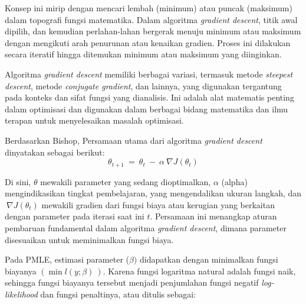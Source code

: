 Konsep ini mirip dengan mencari lembah (minimum) atau puncak (maksimum)
dalam topografi fungsi matematika. Dalam algoritma \emph{gradient
descent}, titik awal dipilih, dan kemudian perlahan-lahan bergerak
menuju minimum atau maksimum dengan mengikuti arah penurunan atau
kenaikan gradien. Proses ini dilakukan secara iteratif hingga ditemukan
minimum atau maksimum yang diinginkan.

Algoritma \emph{gradient descent} memiliki berbagai variasi, termasuk
metode \emph{steepest descent}, metode \emph{conjugate gradient}, dan
lainnya, yang digunakan tergantung pada konteks dan sifat fungsi yang
dianalisis. Ini adalah alat matematis penting dalam optimisasi dan
digunakan dalam berbagai bidang matematika dan ilmu terapan untuk
menyelesaikan masalah optimisasi.
%
\begin{definisi}
    Berdasarkan Bishop\citep*{Bishop2006}, Persamaan utama dari algoritma \emph{gradient
descent} dinyatakan sebagai berikut:
\begin{equation}\label{updateBobot}
    \theta_{t + 1}\  = \ \theta_{t}\  - \ \alpha\ \nabla J\left( \theta_{t} \right)
\end{equation}
\end{definisi}

Di sini, $\theta$ mewakili parameter yang sedang dioptimalkan, \(\alpha\)
(alpha) mengindikasikan tingkat pembelajaran, yang mengendalikan ukuran
langkah, dan\(\ \nabla J\left( \theta_{t} \right)\) mewakili gradien
dari fungsi biaya atau kerugian yang berkaitan dengan parameter pada
iterasi saat ini \(t\). Persamaan ini menangkap aturan pembaruan
fundamental dalam algoritma \emph{gradient descent}, dimana parameter
disesuaikan untuk meminimalkan fungsi biaya.

Pada PMLE, estimasi parameter (\(\beta)\) didapatkan dengan minimalkan
fungsi biayanya \(\left( \min{l(y;\beta)}\  \right)\). Karena fungsi
logaritma natural adalah fungsi naik, sehingga fungsi biayanya tersebut
menjadi penjumlahan fungsi negatif \emph{log-likelihood} dan fungsi
penaltinya, atau ditulis sebagai:

